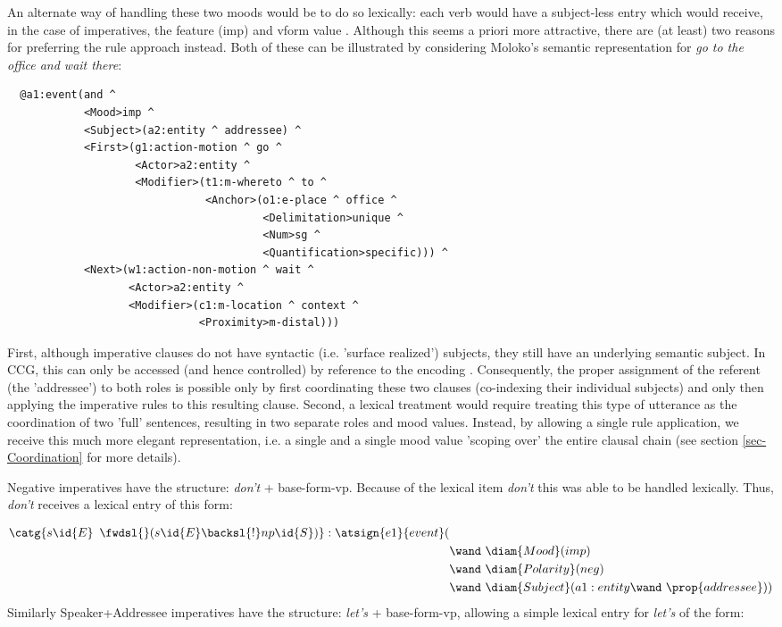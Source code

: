 An alternate way of handling these two moods would be to do so lexically: each verb would have a subject-less entry which would receive, in the case of imperatives, the feature (imp) and vform value . Although this seems a priori more attractive, there are (at least) two reasons for preferring the rule approach instead. Both of these can be illustrated by considering Moloko's semantic representation for \emph{go to the office and wait there}: 
\begin{verbatim}
  @a1:event(and ^ 
            <Mood>imp ^ 
            <Subject>(a2:entity ^ addressee) ^
            <First>(g1:action-motion ^ go ^ 
                    <Actor>a2:entity ^ 
                    <Modifier>(t1:m-whereto ^ to ^ 
                               <Anchor>(o1:e-place ^ office ^ 
                                        <Delimitation>unique ^ 
                                        <Num>sg ^ 
                                        <Quantification>specific))) ^ 
            <Next>(w1:action-non-motion ^ wait ^ 
                   <Actor>a2:entity ^ 
                   <Modifier>(c1:m-location ^ context ^ 
                              <Proximity>m-distal)))
\end{verbatim}
First, although imperative clauses do not have syntactic (i.e. 'surface realized') subjects, they still have an underlying semantic subject. In CCG, this can only be accessed (and hence controlled) by reference to the encoding . Consequently, the proper assignment of the referent  (the 'addressee') to both  roles is possible only by first coordinating these two clauses (co-indexing their individual subjects) and only then applying the imperative rules to this resulting clause. Second, a lexical treatment would require treating this type of utterance as the coordination of two 'full' sentences, resulting in two separate  roles and mood values. Instead, by allowing a single rule application, we receive this much more elegant representation, i.e. a single  and a single mood value 'scoping over' the entire clausal chain (see section \ref{sec-Coordination} for more details).

Negative imperatives have the structure: \emph{don't} + base-form-vp. Because of the lexical item \emph{don't} this was able to be handled lexically. Thus, \emph{don't} receives a lexical entry of this form:
\vspace{-1.5em} %

\begin{align*}
\catg{s\id{E} \enspace \fwdsl{} (s\id{E} \backsl{!}np\id{S} )} :  \atsign{e1}{event}(&   \\ 
      & \wand\ \diam{Mood}(imp) \\
      & \wand\ \diam{Polarity}(neg) \\
      & \wand\ \diam{Subject}(a1:entity \wand\ \prop{addressee}  ) )
\end{align*}
Similarly Speaker+Addressee imperatives have the structure: \emph{let's} + base-form-vp, allowing a simple lexical entry for \emph{let's} of the form:
\vspace{-1.5em} 

